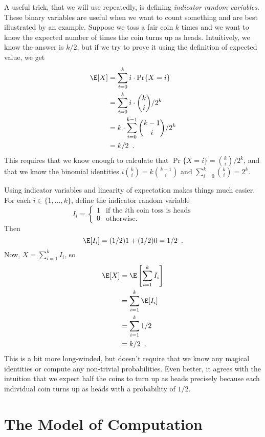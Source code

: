 A useful trick, that we will use repeatedly, is defining \emph{indicator random variables}.   These binary variables are useful when we want to count something and are best illustrated by an example.  Suppose we toss a fair coin $k$ times and we want to know the expected number of times the coin turns up as heads.   Intuitively, we know the answer is $k/2$, but if we try to prove it using the definition of expected value, we get
\begin{align*}
   \E[X] & = \sum_{i=0}^k i\cdot\Pr\{X=i\} \\
         & = \sum_{i=0}^k i\cdot\binom{k}{i}/2^k \\
         & = k\cdot \sum_{i=0}^{k-1}\binom{k-1}{i}/2^k \\
         & = k/2 \enspace .
\end{align*}
This requires that we know enough to calculate that $\Pr\{X=i\} = \binom{k}{i}/2^k$, and that we know the binomial identities $i\binom{k}{i}=k\binom{k-1}{i}$ and $\sum_{i=0}^{k} \binom{k}{i} = 2^{k}$.

Using indicator variables and linearity of expectation makes things much easier.  For each $i\in\{1,\ldots,k\}$, define the indicator random variable
\[
    I_i = \begin{cases}
           1 & \text{if the $i$th coin toss is heads} \\
           0 & \text{otherwise.}
          \end{cases}
\]
Then 
\[ \E[I_i] = (1/2)1 + (1/2)0 = 1/2 \enspace . \]
Now, $X=\sum_{i=1}^k I_i$, so
\begin{align*}
   \E[X] & = \E\left[\sum_{i=1}^k I_i\right] \\
         & = \sum_{i=1}^k \E[I_i] \\
         & = \sum_{i=1}^k 1/2 \\
         & = k/2 \enspace .
\end{align*}
This is a bit more long-winded, but doesn't require that we know any magical identities or compute any non-trivial probabilities. Even better, it agrees with the intuition that we expect half the coins to turn up as heads precisely because each individual coin turns up as heads with a probability of $1/2$.

\section{The Model of Computation}

